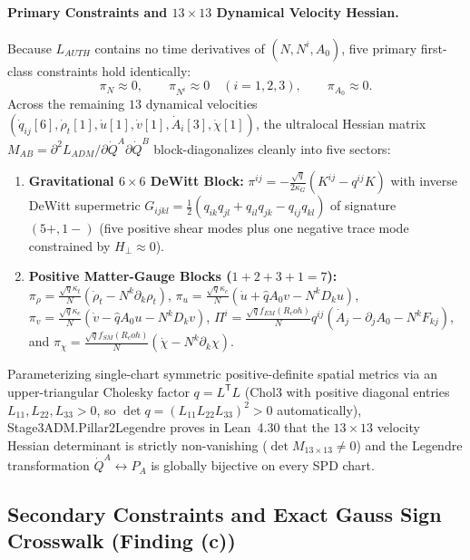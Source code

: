 \documentclass[american,11pt,letterpaper]{article}
\newcommand{\Rcoh}{R_{\mathrm{coh}}}
\def\mathcal#1{#1}%
\def\mathrm#1{#1}%
\def\texttt#1{#1}%
\def\Rcoh{R_coh}%
\begin{document}
\paragraph{Primary Constraints and $13\times 13$ Dynamical Velocity Hessian.}
Because $\mathcal{L}_{\mathrm{AUTH}}$ contains no time derivatives of $(N, N^i, A_0)$, five primary first-class constraints hold identically:
\begin{equation}
\pi_N \approx 0, \qquad \pi_{N^i} \approx 0 \quad (i=1,2,3), \qquad \pi_{A_0} \approx 0.
\label{eq:adm_primary_constraints}
\end{equation}
Across the remaining $13$ dynamical velocities $(\dot{q}_{ij}[6], \dot{\rho}_t[1], \dot{u}[1], \dot{v}[1], \dot{A}_i[3], \dot{\chi}[1])$, the ultralocal Hessian matrix $\mathcal{M}_{AB} = \partial^2\mathcal{L}_{\mathrm{ADM}}/\partial\dot{Q}^A\partial\dot{Q}^B$ block-diagonalizes cleanly into five sectors:
\begin{enumerate}[leftmargin=2em]
  \item \textbf{Gravitational $6\times 6$ DeWitt Block:} $\pi^{ij} = -\frac{\sqrt{q}}{2\kappa_G}(K^{ij} - q^{ij}K)$ with inverse DeWitt supermetric $G_{ijkl} = \frac{1}{2}(q_{ik}q_{jl} + q_{il}q_{jk} - q_{ij}q_{kl})$ of signature $(5+, 1-)$ (five positive shear modes plus one negative trace mode constrained by $\mathcal{H}_\perp \approx 0$).
  \item \textbf{Positive Matter-Gauge Blocks ($1 + 2 + 3 + 1 = 7$):} $\pi_\rho = \frac{\sqrt{q}\kappa_t}{N}(\dot{\rho}_t - N^k\partial_k\rho_t)$, $\pi_u = \frac{\sqrt{q}\kappa_c}{N}(\dot{u} + \hat{q}A_0 v - N^k D_k u)$, $\pi_v = \frac{\sqrt{q}\kappa_c}{N}(\dot{v} - \hat{q}A_0 u - N^k D_k v)$, $\Pi^i = \frac{\sqrt{q}f_{\mathrm{EM}}(\Rcoh)}{N}q^{ij}(\dot{A}_j - \partial_j A_0 - N^k F_{kj})$, and $\pi_\chi = \frac{\sqrt{q}f_{\mathrm{SM}}(\Rcoh)}{N}(\dot{\chi} - N^k\partial_k\chi)$.
\end{enumerate}
Parameterizing single-chart symmetric positive-definite spatial metrics via an upper-triangular Cholesky factor $q = L^{\mathsf{T}} L$ (\texttt{Chol3} with positive diagonal entries $L_{11}, L_{22}, L_{33} > 0$, so $\det q = (L_{11}L_{22}L_{33})^2 > 0$ automatically), \texttt{Stage3\allowbreak{}ADM.\allowbreak{}Pillar2\allowbreak{}Legendre} proves in Lean~4.30 that the $13\times 13$ velocity Hessian determinant is strictly non-vanishing ($\det\mathcal{M}_{13\times 13} \ne 0$) and the Legendre transformation $\dot{Q}^A \leftrightarrow P_A$ is globally bijective on every SPD chart.

\subsection{Secondary Constraints and Exact Gauss Sign Crosswalk (\texttt{Finding (c)})}
\end{document}
